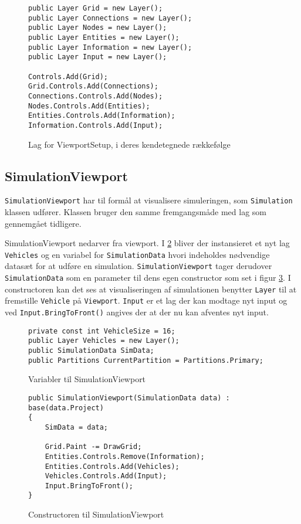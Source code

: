 \begin{figure}[H]
\begin{lstlisting}
public Layer Grid = new Layer();
public Layer Connections = new Layer();
public Layer Nodes = new Layer();
public Layer Entities = new Layer();
public Layer Information = new Layer();
public Layer Input = new Layer();

Controls.Add(Grid);
Grid.Controls.Add(Connections);
Connections.Controls.Add(Nodes);
Nodes.Controls.Add(Entities);
Entities.Controls.Add(Information);
Information.Controls.Add(Input);
\end{lstlisting}
\caption{Lag for ViewportSetup, i deres kendetegnede rækkefølge}
\label{ViewportSetupLayers}
\end{figure}

\subsection{SimulationViewport}\label{SimulationViewport}

\texttt{SimulationViewport} har til formål at visualisere simuleringen, som \texttt{Simulation} klassen udfører. Klassen bruger den samme fremgangsmåde med lag som gennemgået tidligere.

\vspace{5mm}

SimulationViewport nedarver fra viewport. I \ref{ViewPortSimulation1} bliver der instansieret et nyt lag \texttt{Vehicles} og en variabel for \texttt{SimulationData} hvori indeholdes nødvendige datasæt for at udføre en simulation. \texttt{SimulationViewport} tager derudover \texttt{SimulationData} som en parameter til dens egen constructor som set i figur \ref{ViewportSimulationConstructor}. I constructoren kan det ses at visualiseringen af simulationen benytter \texttt{Layer} til at fremstille \texttt{Vehicle} på \texttt{Viewport}. \texttt{Input} er et lag der kan modtage nyt input og ved \texttt{Input.BringToFront()} angives der at der nu kan afventes nyt input. 

\begin{figure}[H]
\begin{lstlisting}
private const int VehicleSize = 16;
public Layer Vehicles = new Layer();
public SimulationData SimData;
public Partitions CurrentPartition = Partitions.Primary;
\end{lstlisting}
\caption{Variabler til SimulationViewport}
\label{ViewPortSimulation1}
\end{figure}

\begin{figure}[H]
\begin{lstlisting}
public SimulationViewport(SimulationData data) : base(data.Project)
{
    SimData = data;
            
    Grid.Paint -= DrawGrid;
    Entities.Controls.Remove(Information);
    Entities.Controls.Add(Vehicles);
    Vehicles.Controls.Add(Input);
    Input.BringToFront();
}
\end{lstlisting}
\caption{Constructoren til SimulationViewport}
\label{ViewportSimulationConstructor}
\end{figure}

